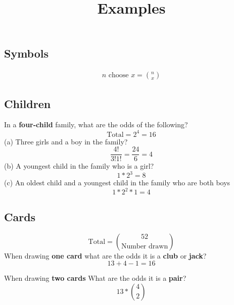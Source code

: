 \documentclass[]{article}
\title{\vspace{-5ex}Examples \vspace{-5ex}}
\author{}
\date{}
\newcommand{\bd}{\textbf}
\begin{document}
	\maketitle{}
	
	\subsection*{Symbols}
	\begin{align*}
		n \text{ choose } x = {n \choose x}
	\end{align*}
	
	\subsection*{Children}
	\par In a \bd{four-child} family, what are the odds of the following?
	\begin{equation*}
		\text{Total} = 2^4 = 16
	\end{equation*}
	(a) Three girls and a boy in the family?
	\begin{equation*}
		\frac{4!}{3!1!} = \frac{24}{6} = 4
	\end{equation*}
	(b) A youngest child in the family who is a girl?
	\begin{equation*}
		1 * 2^3 = 8
	\end{equation*}
	(c) An oldest child and a youngest child in the family who are both boys
	\begin{equation*}
		1 * 2^2 * 1 = 4
	\end{equation*}

	\subsection*{Cards}
	\begin{equation*}
		\text{Total} = {52 \choose \text{Number drawn}}
	\end{equation*}
	\noindent When drawing \bd{one card} what are the odds it is a \bd{club} or \bd{jack}?
	\begin{equation*}
		13 + 4 - 1 = 16
	\end{equation*}

	\noindent When drawing \bd{two cards} What are the odds it is a \bd{pair}?
	\begin{equation*}
		13 * {4 \choose 2}
	\end{equation*}
	
\end{document}
